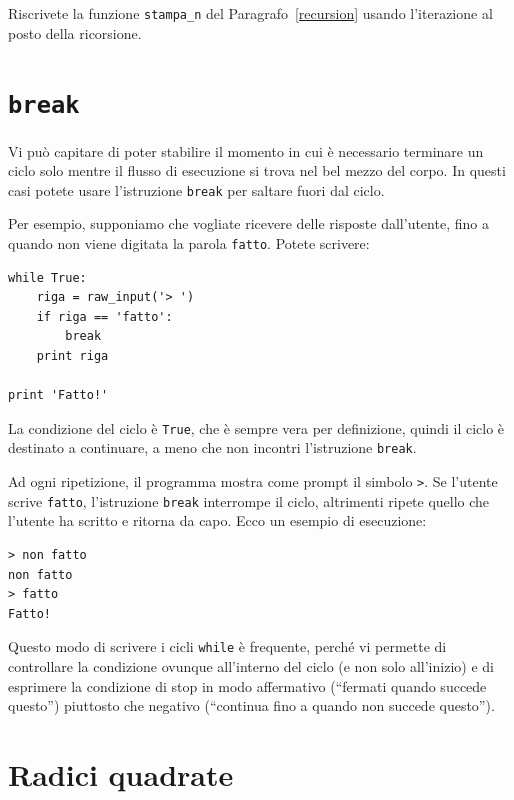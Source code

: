 \documentclass[10pt]{book}
\begin{document}
\vspace{0.2in}
\begin{exercise}

Riscrivete la funzione \verb"stampa_n" del Paragrafo~\ref{recursion} usando l'iterazione al posto della ricorsione.

\end{exercise}


\section{{\tt break}}

Vi può capitare di poter stabilire il momento in cui è necessario terminare un ciclo solo mentre il flusso di esecuzione si trova nel bel mezzo del corpo. In questi casi potete usare l'istruzione {\tt break} per saltare fuori dal ciclo.

Per esempio, supponiamo che vogliate ricevere delle risposte dall'utente, fino a quando non viene digitata la parola {\tt fatto}.  Potete scrivere:

\begin{verbatim}
while True:
    riga = raw_input('> ')
    if riga == 'fatto':
        break
    print riga

print 'Fatto!'
\end{verbatim}
%
La condizione del ciclo è {\tt True}, che è sempre vera per definizione, quindi il ciclo è destinato a continuare, a meno che non incontri l'istruzione {\tt break}.

Ad ogni ripetizione, il programma mostra come prompt il simbolo {\tt >}.
Se l'utente scrive {\tt fatto}, l'istruzione {\tt break} interrompe il ciclo, altrimenti ripete quello che l'utente ha scritto e ritorna da capo. Ecco un esempio di esecuzione:

\begin{verbatim}
> non fatto
non fatto
> fatto
Fatto!
\end{verbatim}
%
Questo modo di scrivere i cicli {\tt while} è frequente, perché vi permette di controllare la condizione ovunque all'interno del ciclo (e non solo all'inizio) e di esprimere la condizione di stop in modo affermativo (``fermati quando succede questo'') piuttosto che negativo (``continua fino a quando non succede questo'').


\section{Radici quadrate}
\label{squareroot}
\end{document}
